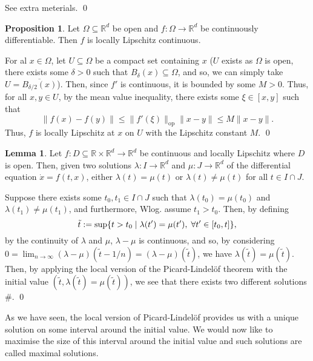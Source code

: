\documentclass[
]{article}
\theoremstyle{definition}
\newtheorem{prop}{Proposition}
\theoremstyle{definition}
\newtheorem{lemma}{Lemma}[section]
\begin{document}
See extra meterials. \qed

\begin{prop}
  Let \(\Omega \subseteq \mathbb{R}^d\) be open and \(f : \Omega \to \mathbb{R}^d\) 
  be continuously differentiable. Then \(f\) is locally Lipschitz continuous.
\end{prop}
\proof

For al \(x \in \Omega\), let \(U \subseteq \Omega\) be a compact set
containing \(x\) (\(U\) exists as \(\Omega\) is open, there exists some
\(\delta > 0\) such that \(B_\delta(x) \subseteq \Omega\), and so, we
can simply take \(U = \overline{B_{\delta / 2}(x)}\)). Then, since
\(f'\) is continuous, it is bounded by some \(M > 0\). Thus, for all
\(x, y \in U\), by the mean value inequality, there exists some
\(\xi \in [x, y]\) such that
\[\|f(x) -f(y)\| \le \|f'(\xi)\|_{\text{op}}\|x - y\| \le M \|x - y\|.\]
Thus, \(f\) is locally Lipschitz at \(x\) on \(U\) with the Lipschitz
constant \(M\). \qed

\begin{lemma}
  Let \(f : D \subseteq \mathbb{R} \times \mathbb{R}^d \to \mathbb{R}^d\) be continuous 
  and locally Lipschitz where \(D\) is open. Then, given two solutions 
  \(\lambda : I \to \mathbb{R}^d\) and \(\mu : J \to \mathbb{R}^d\) of 
  the differential equation \(\dot x = f(t, x)\), either \(\lambda(t) = \mu(t)\) 
  or \(\lambda(t) \neq \mu(t)\) for all \(t \in I \cap J\).
\end{lemma}
\proof

Suppose there exists some \(t_0, t_1 \in I \cap J\) such that
\(\lambda(t_0) = \mu(t_0)\) and \(\lambda(t_1) \neq \mu(t_1)\), and
furthermore, Wlog. assume \(t_1 > t_0\). Then, by defining
\[\tilde t := \sup \{t > t_0 \mid \lambda(t') = \mu(t'), 
    \hspace{1mm} \forall t' \in [t_0, t]\},\] by the continuity of
\(\lambda\) and \(\mu\), \(\lambda - \mu\) is continuous, and so, by
considering
\(0 = \lim_{n \to \infty} (\lambda - \mu)(\tilde t - 1 / n) =  (\lambda - \mu)(\tilde t)\),
we have \(\lambda(\tilde t) = \mu(\tilde t)\). Then, by applying the
local version of the Picard-Lindelöf theorem with the initial value
\((\tilde t, \lambda(\tilde t) = \mu(\tilde t))\), we see that there
exists two different solutions \#. \qed

As we have seen, the local version of Picard-Lindelöf provides us with a
unique solution on some interval around the initial value. We would now
like to maximise the size of this interval around the initial value and
such solutions are called maximal solutions.
\end{document}
